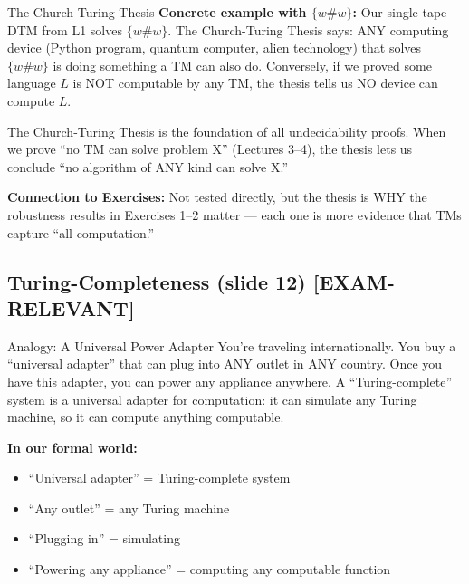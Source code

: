 \documentclass[11pt,a4paper]{article}
\newcommand{\kemark}{\textcolor{red!70!black}{\textbf{[EXAM-RELEVANT]}}}
\newcommand{\kt}[1]{\par\vspace{0.3em}\colorbox{yellow!60}{\parbox{\dimexpr\linewidth-2\fboxsep}{#1}}\vspace{0.3em}}
\begin{document}
\begin{definitionbox}{The Church-Turing Thesis}
\textbf{Concrete example with $\{w\#w\}$:} Our single-tape DTM from L1 solves $\{w\#w\}$. The Church-Turing Thesis says: ANY computing device (Python program, quantum computer, alien technology) that solves $\{w\#w\}$ is doing something a TM can also do. Conversely, if we proved some language $L$ is NOT computable by any TM, the thesis tells us NO device can compute $L$.

\kt{The Church-Turing Thesis is the foundation of all undecidability proofs. When we prove ``no TM can solve problem X'' (Lectures 3--4), the thesis lets us conclude ``no algorithm of ANY kind can solve X.''}

\textbf{Connection to Exercises:} Not tested directly, but the thesis is WHY the robustness results in Exercises 1--2 matter --- each one is more evidence that TMs capture ``all computation.''
\end{definitionbox}

\subsection{Turing-Completeness (slide 12) \kemark}

\begin{notebox}{Analogy: A Universal Power Adapter}
You're traveling internationally. You buy a ``universal adapter'' that can plug into ANY outlet in ANY country. Once you have this adapter, you can power any appliance anywhere. A ``Turing-complete'' system is a universal adapter for computation: it can simulate any Turing machine, so it can compute anything computable.

\textbf{In our formal world:}
\begin{itemize}[nosep]
\item ``Universal adapter'' = Turing-complete system
\item ``Any outlet'' = any Turing machine
\item ``Plugging in'' = simulating
\item ``Powering any appliance'' = computing any computable function
\end{itemize}
\end{notebox}
\end{document}

